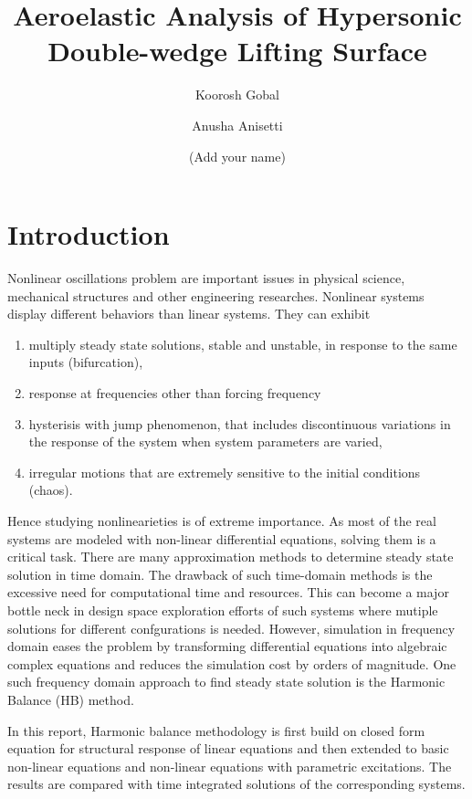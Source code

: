 \documentclass[12pt, a4paper]{extarticle}
\title{Aeroelastic Analysis of Hypersonic Double-wedge Lifting Surface}
\author[1]{Koorosh Gobal}
\author[1]{Anusha Anisetti}
\author[1]{(Add your name)}
\affil[1]{Department of Mechanical and Materials Engineering, Wright State University}
\date{} %
\begin{document}
\maketitle

\abstract{}
\section{Introduction}
{Nonlinear oscillations problem are important issues in physical science, mechanical structures and other engineering researches. Nonlinear systems display different behaviors than linear systems. They can exhibit
\begin{enumerate}  
\item  multiply steady state solutions, stable and unstable, in response to the same inputs (bifurcation),
\item  response at frequencies other than forcing frequency
\item  hysterisis with jump phenomenon, that includes discontinuous variations in the response of the system when system parameters are varied,
\item  irregular motions that are extremely sensitive to the initial conditions (chaos).
\end{enumerate}

Hence studying nonlinearieties is of extreme importance. As most of the real systems are modeled with non-linear differential equations, solving them is a critical task. There are many approximation methods to determine steady state solution in time domain. The drawback of such time-domain methods is the excessive need for computational time and resources. This can become a major bottle neck in design space exploration efforts of such systems where mutiple solutions
for different confgurations is needed. However, simulation in frequency domain eases the problem by transforming differential equations into algebraic complex equations and reduces the simulation cost by orders of magnitude. One such frequency domain approach to find steady state solution is the Harmonic Balance (HB) method. 

In this report, Harmonic balance methodology is first build on closed form equation for structural response of linear equations and then extended to basic non-linear equations and non-linear equations with parametric excitations. The results are compared with time integrated solutions of the corresponding systems.}
\end{document}
